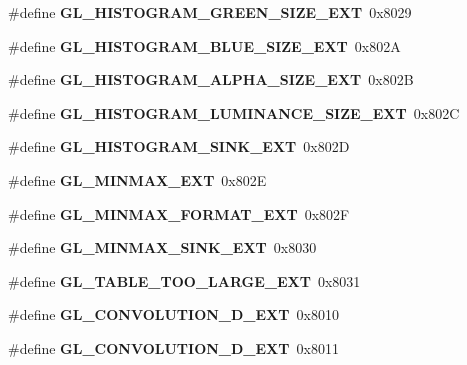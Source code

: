 \begin{DoxyCompactItemize}
\item 
\#define {\bfseries G\+L\+\_\+\+H\+I\+S\+T\+O\+G\+R\+A\+M\+\_\+\+G\+R\+E\+E\+N\+\_\+\+S\+I\+Z\+E\+\_\+\+E\+X\+T}~0x8029\label{_s_d_l__opengl_8h_a7d3c95f5f5526bff5d8eb5993eda24f2}

\item 
\#define {\bfseries G\+L\+\_\+\+H\+I\+S\+T\+O\+G\+R\+A\+M\+\_\+\+B\+L\+U\+E\+\_\+\+S\+I\+Z\+E\+\_\+\+E\+X\+T}~0x802\+A\label{_s_d_l__opengl_8h_a9fec1556824092b376aac027447fa9c9}

\item 
\#define {\bfseries G\+L\+\_\+\+H\+I\+S\+T\+O\+G\+R\+A\+M\+\_\+\+A\+L\+P\+H\+A\+\_\+\+S\+I\+Z\+E\+\_\+\+E\+X\+T}~0x802\+B\label{_s_d_l__opengl_8h_a35c9b64a3db01e7cc4d63fa4250c4480}

\item 
\#define {\bfseries G\+L\+\_\+\+H\+I\+S\+T\+O\+G\+R\+A\+M\+\_\+\+L\+U\+M\+I\+N\+A\+N\+C\+E\+\_\+\+S\+I\+Z\+E\+\_\+\+E\+X\+T}~0x802\+C\label{_s_d_l__opengl_8h_aea3fe7d6edabbdb51fd17b4470a735f4}

\item 
\#define {\bfseries G\+L\+\_\+\+H\+I\+S\+T\+O\+G\+R\+A\+M\+\_\+\+S\+I\+N\+K\+\_\+\+E\+X\+T}~0x802\+D\label{_s_d_l__opengl_8h_a61d47d7210ccece9fa9bbac23d6405d0}

\item 
\#define {\bfseries G\+L\+\_\+\+M\+I\+N\+M\+A\+X\+\_\+\+E\+X\+T}~0x802\+E\label{_s_d_l__opengl_8h_a887374aba79ca68624e8859ed15c8d4c}

\item 
\#define {\bfseries G\+L\+\_\+\+M\+I\+N\+M\+A\+X\+\_\+\+F\+O\+R\+M\+A\+T\+\_\+\+E\+X\+T}~0x802\+F\label{_s_d_l__opengl_8h_acdfd1aafa4b5bf85ff483b5ea4767a74}

\item 
\#define {\bfseries G\+L\+\_\+\+M\+I\+N\+M\+A\+X\+\_\+\+S\+I\+N\+K\+\_\+\+E\+X\+T}~0x8030\label{_s_d_l__opengl_8h_a070887c9a4519be4408ad185a3f84d6a}

\item 
\#define {\bfseries G\+L\+\_\+\+T\+A\+B\+L\+E\+\_\+\+T\+O\+O\+\_\+\+L\+A\+R\+G\+E\+\_\+\+E\+X\+T}~0x8031\label{_s_d_l__opengl_8h_a38c4e29784649f08ced7a8f6605645a4}

\item 
\#define {\bfseries G\+L\+\_\+\+C\+O\+N\+V\+O\+L\+U\+T\+I\+O\+N\+\_\+D\+\_\+\+E\+X\+T}~0x8010\label{_s_d_l__opengl_8h_a1831a92309a1b7dc718e0118e6fce4f4}

\item 
\#define {\bfseries G\+L\+\_\+\+C\+O\+N\+V\+O\+L\+U\+T\+I\+O\+N\+\_\+D\+\_\+\+E\+X\+T}~0x8011\label{_s_d_l__opengl_8h_a025de61ff93f5e5cd93edf66509fd74f}


\end{DoxyCompactItemize}
